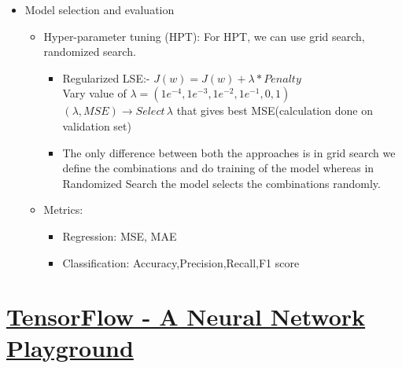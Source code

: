 \documentclass[11pt, twosides]{article}
\begin{document}
\begin{itemize}
\begin{itemize}
    \end{itemize}
    
    \item Model selection and evaluation
    \begin{itemize}
        \item Hyper-parameter tuning (HPT): For HPT, we can use grid search, randomized search.\begin{itemize}
        \item Regularized LSE:- $J(w) = J(w) + \lambda* Penalty$\\
        Vary value of $\lambda = (1e^{-4},1e^{-3},1e^{-2},1e^{-1},0,1)$\\
        $(\lambda,MSE)\rightarrow Select\, \lambda$ that gives best MSE(calculation done on validation set)
        \item The only difference between both the approaches is in grid search we define the combinations and do training of the model whereas in Randomized Search the model selects the combinations randomly.
        \end{itemize}
        \item Metrics:\begin{itemize}\item Regression: MSE, MAE
        \item Classification: Accuracy,Precision,Recall,F1 score
        \end{itemize}
        
    \end{itemize}
\end{itemize}

\section{\href{https://playground.tensorflow.org/}{TensorFlow - A Neural Network Playground}}
\end{document}
